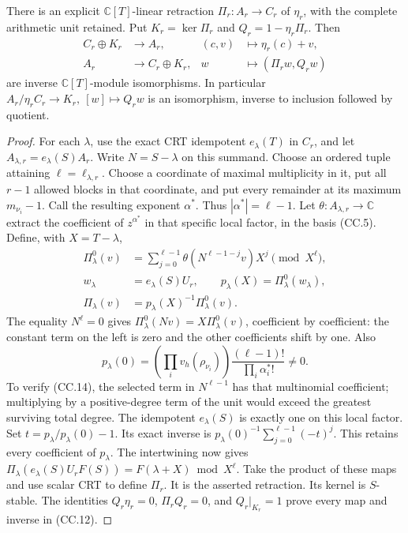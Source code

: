 \begin{theorem}
There is an explicit \(\mathbb C[T]\)-linear retraction
\(\Pi_r:A_r\longrightarrow C_r\) of \(\eta_r\), with the complete
arithmetic unit retained.  Put \(K_r=\ker\Pi_r\) and
\(Q_r=1-\eta_r\Pi_r\).  Then
\[
\begin{split}
 C_r\oplus K_r&\longrightarrow A_r,& (c,v)&\longmapsto\eta_r(c)+v,\\
 A_r&\longrightarrow C_r\oplus K_r,& w&\longmapsto(\Pi_rw,Q_rw)
\end{split}
\tag{CC.12}
\]
are inverse \(\mathbb C[T]\)-module isomorphisms.  In particular
\(A_r/\eta_rC_r\longrightarrow K_r,\ [w]\longmapsto Q_rw\)
is an isomorphism, inverse to inclusion followed by quotient.
\end{theorem}
\begin{proof}
For each \(\lambda\), use the exact CRT idempotent \(e_\lambda(T)\)
in \(C_r\), and let \(A_{\lambda,r}=e_\lambda(S)A_r\).
Write \(N=S-\lambda\) on this summand.
Choose an ordered tuple attaining \(\ell=\ell_{\lambda,r}\).
Choose a coordinate of maximal multiplicity in it, put all \(r-1\)
allowed blocks in that coordinate, and put every remainder at its
maximum \(m_{\nu_i}-1\).  Call the resulting exponent \(\alpha^*\).
Thus \(|\alpha^*|=\ell-1\).
Let \(\theta:A_{\lambda,r}\to\mathbb C\) extract the coefficient
of \(z^{\alpha^*}\) in that specific local factor, in the basis (CC.5).
Define, with \(X=T-\lambda\),
\[
\begin{split}
 \Pi_\lambda^0(v)&=\sum_{j=0}^{\ell-1}
       \theta(N^{\ell-1-j}v)X^j\pmod{X^\ell},\\
 w_\lambda&=e_\lambda(S)U_r,\qquad
 p_\lambda(X)=\Pi_\lambda^0(w_\lambda),\\
 \Pi_\lambda(v)&=p_\lambda(X)^{-1}\Pi_\lambda^0(v).
\end{split}
\tag{CC.13}
\]
The equality \(N^\ell=0\) gives
\(\Pi_\lambda^0(Nv)=X\Pi_\lambda^0(v)\), coefficient by coefficient:
the constant term on the left is zero and the other coefficients
shift by one.  Also
\[
 p_\lambda(0)=
 \left(\prod_i v_h(\rho_{\nu_i})\right)
 \frac{(\ell-1)!}{\prod_i\alpha_i^*!}\ne0.
 \tag{CC.14}
\]
To verify (CC.14), the selected term in \(N^{\ell-1}\) has that
multinomial coefficient; multiplying by a positive-degree term of
the unit would exceed the greatest surviving total degree.
The idempotent \(e_\lambda(S)\) is exactly one on this local factor.
Set \(t=p_\lambda/p_\lambda(0)-1\).  Its exact inverse is
\(p_\lambda(0)^{-1}\sum_{j=0}^{\ell-1}(-t)^j\).
This retains every coefficient of \(p_\lambda\).
The intertwining now gives
\(\Pi_\lambda(e_\lambda(S)U_rF(S))=F(\lambda+X)\bmod X^\ell\).
Take the product of these maps and use scalar CRT to define \(\Pi_r\).
It is the asserted retraction.  Its kernel is \(S\)-stable.
The identities \(Q_r\eta_r=0\), \(\Pi_rQ_r=0\), and
\(Q_r|_{K_r}=1\) prove every map and inverse in (CC.12).
\end{proof}

